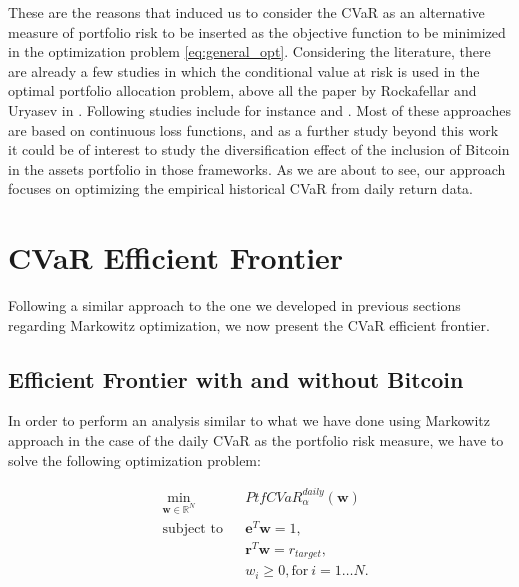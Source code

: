 \bigskip
These are the reasons that induced us to consider the CVaR as an alternative measure of portfolio risk to be inserted as the objective function to be minimized in the optimization problem \eqref{eq:general_opt}. 
Considering the literature, there are already a few studies in which the conditional value at risk is used in the optimal portfolio allocation problem,  above all the paper by Rockafellar and Uryasev in \citep{ROCKAFELLAR2000}. Following studies include for instance  \citep{DICLEMENTE2002} and \citep{QUARANTA2008}. 
Most of these approaches are based on continuous loss functions, and as a further study beyond this work it could be of interest to study the diversification effect of the inclusion of Bitcoin in the assets portfolio in those frameworks. As we are about to see, our approach  focuses on optimizing the empirical historical CVaR from daily return data.




\section{CVaR Efficient Frontier}
\label{sec:cvar_frontier}

Following a similar approach to the one we developed in previous sections regarding Markowitz optimization, we  now present the CVaR efficient frontier.

\subsection{Efficient Frontier with and without Bitcoin}


In order to perform an  analysis similar to what we have done using Markowitz approach in the case of the daily CVaR as the portfolio risk measure, we have to solve the following optimization problem:

\begin{subequations}
	\label{eq:general_opt_CVaR}
	\begin{align}
	&\!\min_{\mathbf{w}\in \mathbb{R}^{N}}     &    & PtfCVaR_\alpha^{daily}(\mathbf{w}) \\
	& \text{subject to}   &   & \mathbf{e}^T\mathbf{w} = 1 ,\\
	&                 &       & \mathbf{r}^T\mathbf{w} = r_{target},\label{eq:constraint2b} \\
	&		   &      & w_{i} \geq 0, \text{for} \: i = 1\dots N. 
	\end{align}
\end{subequations}

